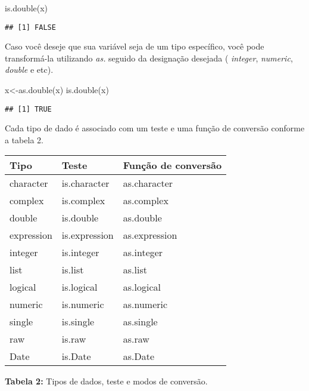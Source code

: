 \documentclass[
]{book}
\newenvironment{Shaded}{\begin{snugshade}}{\end{snugshade}}
\newcommand{\FunctionTok}[1]{\textcolor[rgb]{0.00,0.00,0.00}{#1}}
\newcommand{\NormalTok}[1]{#1}
\newcommand{\OtherTok}[1]{\textcolor[rgb]{0.56,0.35,0.01}{#1}}
\begin{document}
\begin{Shaded}
\begin{Highlighting}[]
\FunctionTok{is.double}\NormalTok{(x) }
\end{Highlighting}
\end{Shaded}

\begin{verbatim}
## [1] FALSE
\end{verbatim}

Caso você deseje que sua variável seja de um tipo específico, você pode transformá-la utilizando \emph{as.} seguido da designação desejada ( \emph{integer}, \emph{numeric}, \emph{double} e etc).

\begin{Shaded}
\begin{Highlighting}[]
\NormalTok{x}\OtherTok{\textless{}{-}}\FunctionTok{as.double}\NormalTok{(x)}
\FunctionTok{is.double}\NormalTok{(x)}
\end{Highlighting}
\end{Shaded}

\begin{verbatim}
## [1] TRUE
\end{verbatim}

Cada tipo de dado é associado com um teste e uma função de conversão conforme a tabela 2.

\begin{tabular}{l|l|l}
\hline
Tipo & Teste & Função de conversão\\
\hline
character & is.character & as.character\\
\hline
complex & is.complex & as.complex\\
\hline
double & is.double & as.double\\
\hline
expression & is.expression & as.expression\\
\hline
integer & is.integer & as.integer\\
\hline
list & is.list & as.list\\
\hline
logical & is.logical & as.logical\\
\hline
numeric & is.numeric & as.numeric\\
\hline
single & is.single & as.single\\
\hline
raw & is.raw & as.raw\\
\hline
Date & is.Date & as.Date\\
\hline
\end{tabular}

\textbf{Tabela 2:} Tipos de dados, teste e modos de conversão.
\end{document}
